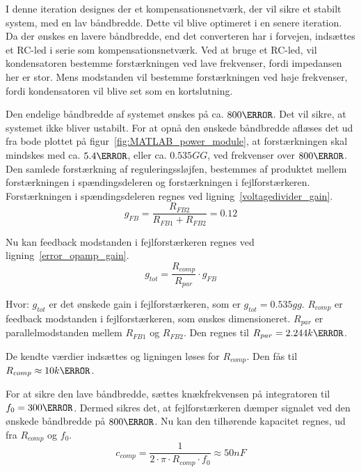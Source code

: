 \noindent I denne iteration designes der et kompensationsnetværk, der vil sikre et stabilt system, med en lav båndbredde. Dette vil blive optimeret i en senere iteration. 
Da der ønskes en lavere båndbredde, end det converteren har i forvejen, indsættes et RC-led i serie som kompensationsnetværk. Ved at bruge et RC-led, vil kondensatoren bestemme forstærkningen ved lave frekvenser, fordi impedansen her er stor. Mens modstanden vil bestemme forstærkningen ved høje frekvenser, fordi kondensatoren vil blive set som en kortslutning. 

Den endelige båndbredde af systemet ønskes på ca. $800\hertz$. Det vil sikre, at systemet ikke bliver ustabilt. For at opnå den ønskede båndbredde aflæses det ud fra bode plottet på figur~\ref{fig:MATLAB_power_module}, at forstærkningen skal mindskes med ca. $5.4\decibel$, eller ca. $0.535GG$, ved frekvenser over $800\hertz$. Den samlede forstærkning af reguleringssløjfen, bestemmes af produktet mellem forstærkningen i spændingsdeleren og forstærkningen i fejlforstærkeren. Forstærkningen i spændingsdeleren regnes ved ligning~\ref{voltagedivider_gain}.
\begin{equation} \label{voltagedivider_gain}
g_{FB} = \frac{R_{FB2}}{R_{FB1}+R_{FB2}} = 0.12
\end{equation}

\noindent Nu kan feedback modstanden i fejlforstærkeren regnes ved ligning~\ref{error_opamp_gain}. 
\begin{equation} \label{error_opamp_gain}
g_{tot} = \frac{R_{comp}}{R_{par}} \cdot g_{FB}
\end{equation}

\noindent Hvor:
\newline \noindent $g_{tot}$ er det ønskede gain i fejlforstærkeren, som er $g_{tot}=0.535gg$.
\newline \noindent $R_{comp}$ er feedback modstanden i fejlforstærkeren, som ønskes dimensioneret.
\newline \noindent $R_{par}$ er parallelmodstanden mellem $R_{FB1}$ og $R_{FB2}$. Den regnes til $R_{par}=2.244k\ohm$.

\noindent De kendte værdier indsættes og ligningen løses for $R_{comp}$. Den fås til $R_{comp}\approx 10k\ohm$.


\noindent For at sikre den lave båndbredde, sættes knækfrekvensen på integratoren til $f_0=300\hertz$. Dermed sikres det, at fejlforstærkeren dæmper signalet ved den ønskede båndbredde på $800\hertz$. Nu kan den tilhørende kapacitet regnes, ud fra $R_{comp}$ og $f_0$.
\begin{equation} \label{c_comp}
c_{comp} = \frac{1}{2\cdot \pi \cdot R_{comp} \cdot f_0} \approx 50nF
\end{equation}

